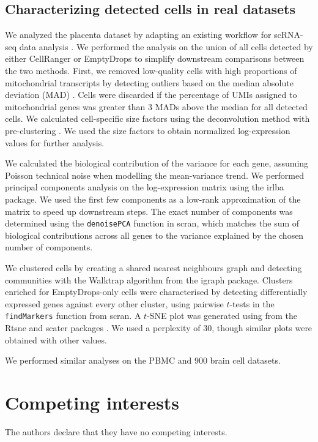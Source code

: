 \documentclass{bmcart}
\newcommand{\code}[1]{\texttt{#1}}
\begin{document}
\subsection*{Characterizing detected cells in real datasets}
We analyzed the placenta dataset by adapting an existing workflow for scRNA-seq data analysis \cite{lun2016stepbystep}.
We performed the analysis on the union of all cells detected by either CellRanger or EmptyDrops to simplify downstream comparisons between the two methods.
First, we removed low-quality cells with high proportions of mitochondrial transcripts by detecting outliers based on the median absolute deviation (MAD) \cite{mccarthy2017scater}.
Cells were discarded if the percentage of UMIs assigned to mitochondrial genes was greater than 3 MADs above the median for all detected cells.
We calculated cell-specific size factors using the deconvolution method with pre-clustering \cite{lun2016pooling}.
We used the size factors to obtain normalized log-expression values for further analysis.

We calculated the biological contribution of the variance for each gene, assuming Poisson technical noise when modelling the mean-variance trend.
We performed principal components analysis on the log-expression matrix using the \textsf{irlba} package.
We used the first few components as a low-rank approximation of the matrix to speed up downstream steps.
The exact number of components was determined using the \code{denoisePCA} function in \textsf{scran},
which matches the sum of biological contributions across all genes to the variance explained by the chosen number of components.

We clustered cells by creating a shared nearest neighbours graph \cite{xu2015identification} and detecting communities with the Walktrap algorithm from the \textsf{igraph} package.
Clusters enriched for EmptyDrops-only cells were characterised by detecting differentially expressed genes against every other cluster,
using pairwise $t$-tests in the \code{findMarkers} function from \textsf{scran}.
A $t$-SNE plot \cite{van2008visualizing} was generated using from the \textsf{Rtsne} and \textsf{scater} packages \cite{mccarthy2017scater}.
We used a perplexity of 30, though similar plots were obtained with other values.

We performed similar analyses on the PBMC and 900 brain cell datasets.

\section*{Competing interests}
The authors declare that they have no competing interests.
\end{document}

